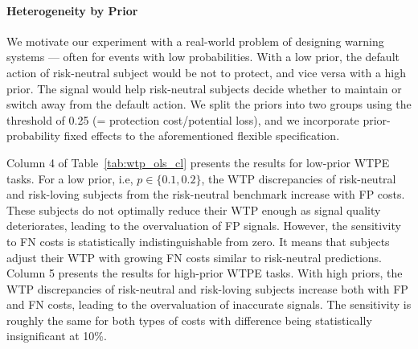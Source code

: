 \documentclass[12pt,a4paper]{article}
\begin{document}
\paragraph{Heterogeneity by Prior} We motivate our experiment with a real-world problem of designing warning systems --- often for events with low probabilities. With a low prior, the default action of risk-neutral subject would be not to protect, and vice versa with a high prior. The signal would help risk-neutral subjects decide whether to maintain or switch away from the default action. We split the priors into two groups using the threshold of 0.25 (= protection cost/potential loss), and we incorporate prior-probability fixed effects to the aforementioned flexible specification. 

Column 4 of Table~\ref{tab:wtp_ols_cl} presents the results for low-prior WTPE tasks. For a low prior, i.e, $p \in \{0.1,0.2\}$, the WTP discrepancies of risk-neutral and risk-loving subjects from the risk-neutral benchmark increase with FP costs. These subjects do not optimally reduce their WTP enough as signal quality deteriorates, leading to the overvaluation of FP signals. However, the sensitivity to FN costs is statistically indistinguishable from zero. It means that subjects adjust their WTP with growing FN costs similar to risk-neutral predictions. Column 5 presents the results for high-prior WTPE tasks. With high priors, the WTP discrepancies of risk-neutral and risk-loving subjects increase both with FP and FN costs, leading to the overvaluation of inaccurate signals. The sensitivity is roughly the same for both types of costs with difference being statistically insignificant at 10\%.
\end{document}
